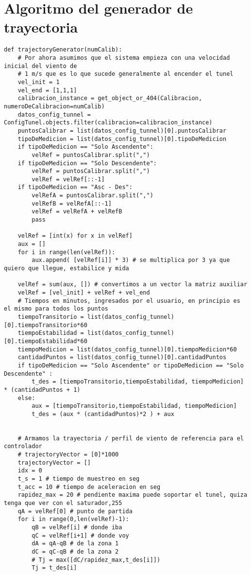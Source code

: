 \section{Algoritmo del generador de trayectoria}
\begin{lstlisting}[style=pythonstyle, caption={Algoritmo generador de referencias para el controlador PID.}, label=cdg:genTrayectoria, basicstyle=\ttfamily\fontsize{8}{8}\selectfont]
def trajectoryGenerator(numCalib):
    # Por ahora asumimos que el sistema empieza con una velocidad inicial del viento de
    # 1 m/s que es lo que sucede generalmente al encender el tunel
    vel_init = 1
    vel_end = [1,1,1]
    calibracion_instance = get_object_or_404(Calibracion, numeroDeCalibracion=numCalib)
    datos_config_tunnel = ConfigTunel.objects.filter(calibracion=calibracion_instance)
    puntosCalibrar = list(datos_config_tunnel)[0].puntosCalibrar
    tipoDeMedicion = list(datos_config_tunnel)[0].tipoDeMedicion
    if tipoDeMedicion == "Solo Ascendente":
        velRef = puntosCalibrar.split(",")
    if tipoDeMedicion == "Solo Descendente":        
        velRef = puntosCalibrar.split(",")
        velRef = velRef[::-1]
    if tipoDeMedicion == "Asc - Des":        
        velRefA = puntosCalibrar.split(",")
        velRefB = velRefA[::-1]
        velRef = velRefA + velRefB
        pass
        
    velRef = [int(x) for x in velRef]
    aux = []
    for i in range(len(velRef)):
        aux.append( [velRef[i]] * 3) # se multiplica por 3 ya que quiero que llegue, estabilice y mida
    
    velRef = sum(aux, []) # convertimos a un vector la matriz auxiliar
    velRef = [vel_init] + velRef + vel_end
    # Tiempos en minutos, ingresados por el usuario, en principio es el mismo para todos los puntos
    tiempoTransitorio = list(datos_config_tunnel)[0].tiempoTransitorio*60
    tiempoEstabilidad = list(datos_config_tunnel)[0].tiempoEstabilidad*60
    tiempoMedicion = list(datos_config_tunnel)[0].tiempoMedicion*60
    cantidadPuntos = list(datos_config_tunnel)[0].cantidadPuntos
    if tipoDeMedicion == "Solo Ascendente" or tipoDeMedicion == "Solo Descendente" :
        t_des = [tiempoTransitorio,tiempoEstabilidad, tiempoMedicion] * (cantidadPuntos + 1)
    else:
        aux = [tiempoTransitorio,tiempoEstabilidad, tiempoMedicion]
        t_des = (aux * (cantidadPuntos)*2 ) + aux
        
    
    # Armamos la trayectoria / perfil de viento de referencia para el controlador
    # trajectoryVector = [0]*1000
    trajectoryVector = []
    idx = 0
    t_s = 1 # tiempo de muestreo en seg
    t_acc = 10 # tiempo de aceleracion en seg
    rapidez_max = 20 # pendiente maxima puede soportar el tunel, quiza tenga que ver con el saturador,255
    qA = velRef[0] # punto de partida
    for i in range(0,len(velRef)-1):
        qB = velRef[i] # donde iba
        qC = velRef[i+1] # donde voy
        dA = qA-qB # de la zona 1
        dC = qC-qB # de la zona 2
        # Tj = max([dC/rapidez_max,t_des[i]])
        Tj = t_des[i]
    

\end{lstlisting}
